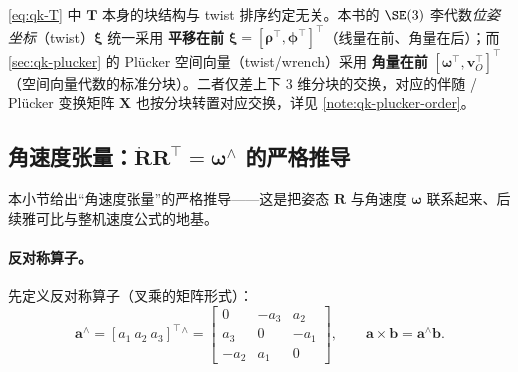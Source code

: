 \begin{note}[se(3) 平移在前的换算]\label{note:qk-twist-order}
\cref{eq:qk-T} 中 $\mathbf{T}$ 本身的块结构与 twist 排序约定无关。本书的 $\SE(3)$ 李代数\emph{位姿坐标}（twist）$\boldsymbol{\xi}$ 统一采用 \textbf{平移在前} $\boldsymbol{\xi}=[\boldsymbol{\rho}^\top,\boldsymbol{\phi}^\top]^\top$（线量在前、角量在后）；而 \cref{sec:qk-plucker} 的 Plücker 空间向量（twist/wrench）采用 \textbf{角量在前} $[\boldsymbol{\omega}^\top,\boldsymbol{v}_O^\top]^\top$（空间向量代数的标准分块）。二者仅差上下 $3$ 维分块的交换，对应的伴随 / Plücker 变换矩阵 $\mathbf{X}$ 也按分块转置对应交换，详见 \cref{note:qk-plucker-order}。
\end{note}

\subsection{角速度张量：$\dot{\mathbf{R}}\mathbf{R}^\top=\boldsymbol{\omega}^\wedge$ 的严格推导}
\label{subsec:qk-angular-vel}

本小节给出“角速度张量”的严格推导\cite{yu2021quadruped}——这是把姿态 $\mathbf{R}$ 与角速度 $\boldsymbol{\omega}$ 联系起来、后续雅可比与整机速度公式的地基。

\paragraph{反对称算子。}
先定义反对称算子（叉乘的矩阵形式）\cite{yu2021quadruped,unitree2023quadruped}：
\begin{equation}
  \boldsymbol{a}^{\wedge}=[a_1\ a_2\ a_3]^\top{}^{\wedge}
  =\begin{bmatrix}0&-a_3&a_2\\a_3&0&-a_1\\-a_2&a_1&0\end{bmatrix},
  \qquad \boldsymbol{a}\times\boldsymbol{b}=\boldsymbol{a}^{\wedge}\boldsymbol{b}.
  \label{eq:qk-skew}
\end{equation}

